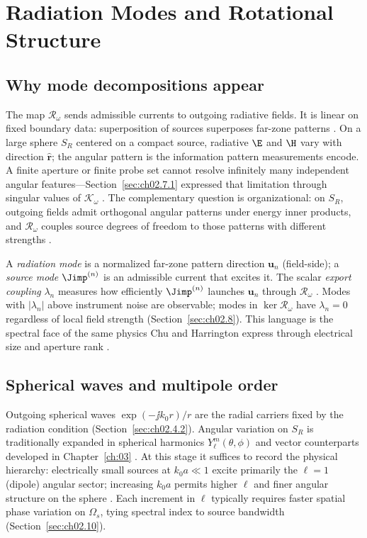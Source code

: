 
\section{Radiation Modes and Rotational Structure}
\label{sec:ch02.7b}

\subsection{Why mode decompositions appear}
\label{sec:ch02.7b.1}

The map $\mathcal{R}_\omega$ sends admissible currents to outgoing radiative fields. It is linear on fixed boundary data: superposition of sources superposes far-zone patterns \cite{stratton1941,harrington2001}. On a large sphere $S_R$ centered on a compact source, radiative $\E$ and $\H$ vary with direction $\hat{\mathbf{r}}$; the angular pattern is the information pattern measurements encode. A finite aperture or finite probe set cannot resolve infinitely many independent angular features---Section~\ref{sec:ch02.7.1} expressed that limitation through singular values of $\mathcal{K}_\omega$ \cite{chu1948,hansen1988}. The complementary question is organizational: on $S_R$, outgoing fields admit orthogonal angular patterns under energy inner products, and $\mathcal{R}_\omega$ couples source degrees of freedom to those patterns with different strengths \cite{stratton1941}.

A \emph{radiation mode} is a normalized far-zone pattern direction $\mathbf{u}_n$ (field-side); a \emph{source mode} $\Jimp^{(n)}$ is an admissible current that excites it. The scalar \emph{export coupling} $\lambda_n$ measures how efficiently $\Jimp^{(n)}$ launches $\mathbf{u}_n$ through $\mathcal{R}_\omega$ \cite{harrington2001}. Modes with $|\lambda_n|$ above instrument noise are observable; modes in $\ker\mathcal{R}_\omega$ have $\lambda_n=0$ regardless of local field strength (Section~\ref{sec:ch02.8}). This language is the spectral face of the same physics Chu and Harrington express through electrical size and aperture rank \cite{chu1948,harrington2001}.

\subsection{Spherical waves and multipole order}
\label{sec:ch02.7b.2}

Outgoing spherical waves $\exp(-\jj k_0 r)/r$ are the radial carriers fixed by the radiation condition (Section~\ref{sec:ch02.4.2}). Angular variation on $S_R$ is traditionally expanded in spherical harmonics $Y_\ell^m(\theta,\phi)$ and vector counterparts developed in Chapter~\ref{ch:03} \cite{stratton1941,jackson1999}. At this stage it suffices to record the physical hierarchy: electrically small sources at $k_0 a\ll1$ excite primarily the $\ell=1$ (dipole) angular sector; increasing $k_0 a$ permits higher $\ell$ and finer angular structure on the sphere \cite{chu1948,jackson1999}. Each increment in $\ell$ typically requires faster spatial phase variation on $\Omega_s$, tying spectral index to source bandwidth (Section~\ref{sec:ch02.10}).

